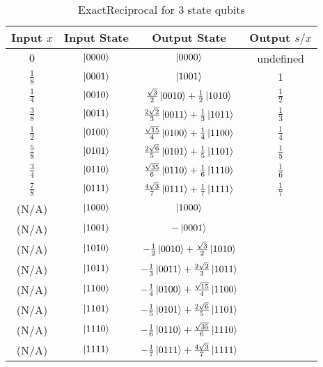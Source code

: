 \documentclass[12pt]{extarticle}
\begin{document}
\begin{table}[h!]
\centering
\begin{tabular}{|c|c|c|c|}
\hline
Input $x$     & Input State  & Output State                                               & Output $s/x$  \\
\hline
$0$           & $\ket{0000}$ & $\ket{0000}$                                               & undefined     \\
$\frac{1}{8}$ & $\ket{0001}$ & $ \ket{1001}$                                              & $1$           \\
$\frac{1}{4}$ & $\ket{0010}$ & $\frac{\sqrt{3}}{2} \ket{0010} + \frac{1}{2} \ket{1010}$   & $\frac{1}{2}$ \\
$\frac{3}{8}$ & $\ket{0011}$ & $\frac{2\sqrt{2}}{3} \ket{0011} + \frac{1}{3} \ket{1011}$  & $\frac{1}{3}$ \\
$\frac{1}{2}$ & $\ket{0100}$ & $\frac{\sqrt{15}}{4} \ket{0100} + \frac{1}{4} \ket{1100}$  & $\frac{1}{4}$ \\
$\frac{5}{8}$ & $\ket{0101}$ & $\frac{2\sqrt{6}}{5} \ket{0101} + \frac{1}{5} \ket{1101}$  & $\frac{1}{5}$ \\
$\frac{3}{4}$ & $\ket{0110}$ & $\frac{\sqrt{35}}{6} \ket{0110} + \frac{1}{6} \ket{1110}$  & $\frac{1}{6}$ \\
$\frac{7}{8}$ & $\ket{0111}$ & $\frac{4\sqrt{3}}{7} \ket{0111} + \frac{1}{7} \ket{1111}$  & $\frac{1}{7}$ \\
(N/A)         & $\ket{1000}$ & $\ket{1000}$                                               & \\
(N/A)         & $\ket{1001}$ & $-\ket{0001}$                                              & \\
(N/A)         & $\ket{1010}$ & $-\frac{1}{2} \ket{0010} + \frac{\sqrt{3}}{2} \ket{1010}$  & \\
(N/A)         & $\ket{1011}$ & $-\frac{1}{3} \ket{0011} + \frac{2\sqrt{2}}{3} \ket{1011}$ & \\
(N/A)         & $\ket{1100}$ & $-\frac{1}{4} \ket{0100} + \frac{\sqrt{15}}{4} \ket{1100}$ & \\
(N/A)         & $\ket{1101}$ & $-\frac{1}{5} \ket{0101} + \frac{2\sqrt{6}}{5} \ket{1101}$ & \\
(N/A)         & $\ket{1110}$ & $-\frac{1}{6} \ket{0110} + \frac{\sqrt{35}}{6} \ket{1110}$ & \\
(N/A)         & $\ket{1111}$ & $-\frac{1}{7} \ket{0111} + \frac{4\sqrt{3}}{7} \ket{1111}$ & \\
\hline
\end{tabular}
\caption{ExactReciprocal for 3 state qubits}
\label{tab:exactreciprocal3}
\end{table}
\end{document}
